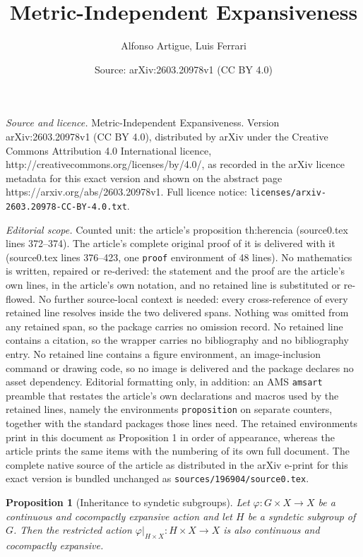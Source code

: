 \documentclass[10pt,a4paper]{amsart}
\title{Metric-Independent Expansiveness}
\author{Alfonso Artigue, Luis Ferrari}
\date{Source: arXiv:2603.20978v1 (CC BY 4.0)}
\newtheorem{proposition}{Proposition}
\begin{document}
\maketitle

\noindent\emph{Source and licence.} Metric-Independent Expansiveness. Version arXiv:2603.20978v1 (CC BY 4.0), distributed by arXiv under the Creative Commons Attribution 4.0 International licence, http://creativecommons.org/licenses/by/4.0/, as recorded in the arXiv licence metadata for this exact version and shown on the abstract page https://arxiv.org/abs/2603.20978v1. Full licence notice: \texttt{licenses/arxiv-2603.20978-CC-BY-4.0.txt}.\par\smallskip

\noindent\textit{Editorial scope.} Counted unit: the article's proposition th:herencia (source0.tex lines 372--374). The article's complete original proof of it is delivered with it (source0.tex lines 376--423, one \texttt{proof} environment of 48 lines). No mathematics is written, repaired or re-derived: the statement and the proof are the article's own lines, in the article's own notation, and no retained line is substituted or re-flowed.  No further source-local context is needed: every cross-reference of every retained line resolves inside the two delivered spans.  Nothing was omitted from any retained span, so the package carries no omission record.  No retained line contains a citation, so the wrapper carries no bibliography and no bibliography entry.  No retained line contains a figure environment, an image-inclusion command or drawing code, so no image is delivered and the package declares no asset dependency.  Editorial formatting only, in addition: an AMS \texttt{amsart} preamble that restates the article's own declarations and macros used by the retained lines, namely the environments \texttt{proposition} on separate counters, together with the standard packages those lines need.  The retained environments print in this document as Proposition 1 in order of appearance, whereas the article prints the same items with the numbering of its own full document.  The complete native source of the article as distributed in the arXiv e-print for this exact version is bundled unchanged as \texttt{sources/196904/source0.tex}.
\begin{proposition}[Inheritance to syndetic subgroups] \label{th:herencia}
Let \( \varphi : G \times X \to X \) be a continuous and cocompactly expansive action and let \( H \) be a syndetic subgroup of \( G \). Then the restricted action \( \varphi|_{H \times X} : H \times X \to X \) is also continuous and cocompactly expansive.
\end{proposition}
\end{document}
